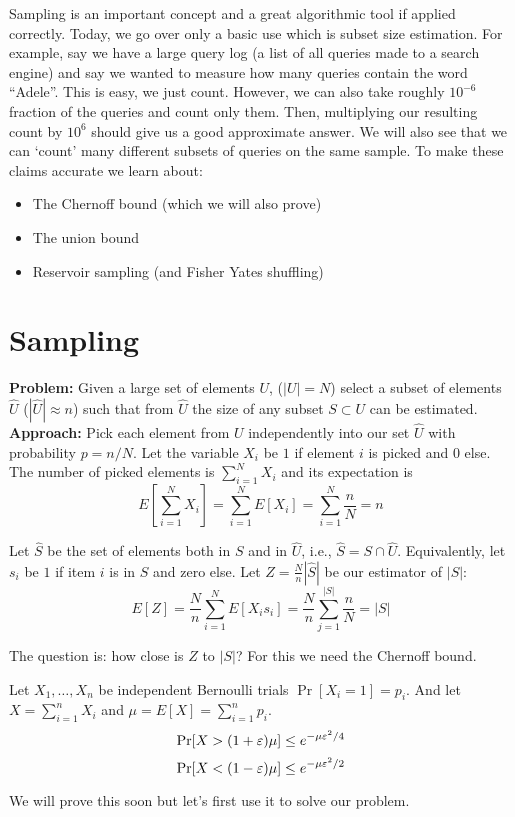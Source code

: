 

Sampling is an important concept and a great algorithmic tool if applied correctly.
Today, we go over only a basic use which is subset size estimation.
For example, say we have a large query log (a list of all queries made to a search engine)
and say we wanted to measure how many queries contain the word ``Adele''.
This is easy, we just count. 
However, we can also take roughly $10^{-6}$ fraction of the queries and count only them.
Then, multiplying our resulting count by $10^{6}$ should give us a good approximate answer.
We will also see that we can `count' many different subsets of queries on the same sample.
To make these claims accurate we learn about:
\begin{itemize}
\item The Chernoff bound (which we will also prove)
\item The union bound 
\item Reservoir sampling (and Fisher Yates shuffling)
\end{itemize}



\section{Sampling}

{\bf Problem:} Given a large set of elements $U$, ($|U|=N$) select a subset of elements 
$\hat{U}$ ($|\hat{U}| \approx n$) such that from 
$\hat{U}$ the size of any subset $S \subset U$ can be estimated.\\
{\bf Approach:} Pick each element from $U$ independently into our set $\hat{U}$ with probability $p = n/N$.
Let the variable $X_i$ be $1$ if element $i$ is picked and $0$ else.
The number of picked elements is $\sum_{i=1}^{N} X_i$ and its expectation is 
$$E[\sum_{i=1}^{N} X_i] = \sum_{i=1}^{N}E[X_i] = \sum_{i=1}^{N}\frac{n}{N} = n$$

Let $\hat{S}$ be the set of elements both in $S$ and in $\hat{U}$, i.e., $\hat{S} =  S \cap \hat{U}$. 
Equivalently, let $s_i$ be $1$ if item $i$ is in $S$ and zero else. 
Let $Z = \frac{N}{n}|\hat{S}|$ be our estimator of $|S|$:
\[
E[Z] = \frac{N}{n}\sum_{i=1}^{N}E[X_i s_i] = \frac{N}{n}\sum_{j=1}^{|S|} \frac{n}{N} =  |S|
\]

\noindent The question is: how close is $Z$ to $|S|$? For this we need the Chernoff bound.

\begin{lemma}
Let $X_1,\ldots,X_n$ be independent Bernoulli trials $\Pr[X_i=1] = p_i$. 
And let $X = \sum_{i=1}^{n}X_i$ and $\mu = E[X] = \sum_{i=1}^{n}p_i$.
\begin{equation}
\Pr[X > (1 + \varepsilon)\mu] \le e^{-\mu \varepsilon^2/4}
\end{equation} 
\begin{equation}
\Pr[X < (1 - \varepsilon)\mu] \le e^{-\mu \varepsilon^2/2}
\end{equation} 
\end{lemma}
We will prove this soon but let's first use it to solve our problem.

